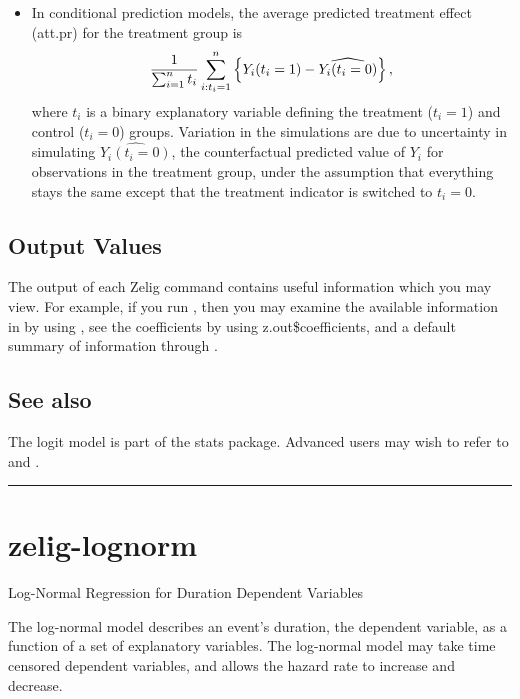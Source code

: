 \documentclass[letterpaper,10pt,english]{sphinxmanual}
\begin{document}
\begin{itemize}
\item {} 
In conditional prediction models, the average predicted treatment
effect (att.pr) for the treatment group is
\begin{gather}
\begin{split}\frac{1}{\sum_{i=1}^n t_i}\sum_{i:t_i=1}^n \left\{ Y_i(t_i=1) -
      \widehat{Y_i(t_i=0)}\right\},\end{split}\notag
\end{gather}
where \(t_i\) is a binary explanatory variable defining the
treatment (\(t_i=1\)) and control (\(t_i=0\)) groups.
Variation in the simulations are due to uncertainty in simulating
\(\widehat{Y_i(t_i=0)}\), the counterfactual predicted value of
\(Y_i\) for observations in the treatment group, under the
assumption that everything stays the same except that the treatment
indicator is switched to \(t_i=0\).

\end{itemize}


\subsection{Output Values}
\label{vignette:id10}
The output of each Zelig command contains useful information which you
may view. For example, if you run
, then you may examine the
available information in  by using , see the
coefficients by using z.out\$coefficients, and a default summary of
information through .


\subsection{See also}
\label{vignette:id11}
The logit model is part of the stats package. Advanced users may
wish to refer to  and .


\bigskip\hrule{}\bigskip



\section{zelig-lognorm}
\label{vignette:zelig-lognorm}\label{vignette:zlognorm}
Log-Normal Regression for Duration Dependent Variables

The log-normal model describes an event’s duration, the dependent
variable, as a function of a set of explanatory variables. The
log-normal model may take time censored dependent variables, and allows
the hazard rate to increase and decrease.
\end{document}
